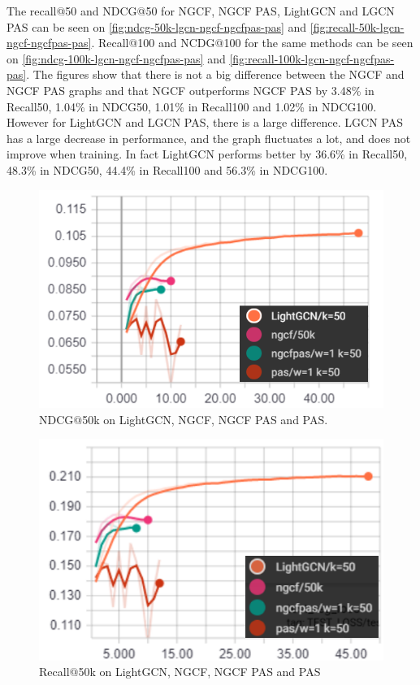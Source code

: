 The recall@50 and NDCG@50 for NGCF, NGCF PAS, LightGCN and LGCN PAS can be seen on \autoref{fig:ndcg-50k-lgcn-ngcf-ngcfpas-pas} and \autoref{fig:recall-50k-lgcn-ngcf-ngcfpas-pas}.
Recall@100 and NCDG@100 for the same methods can be seen on \autoref{fig:ndcg-100k-lgcn-ngcf-ngcfpas-pas} and \autoref{fig:recall-100k-lgcn-ngcf-ngcfpas-pas}.
The figures show that there is not a big difference between the NGCF and NGCF PAS graphs and that NGCF outperforms NGCF PAS by 3.48\% in Recall\@50, 1.04\% in NDCG\@50, 1.01\% in Recall\@100 and 1.02\% in NDCG\@100.
However for LightGCN and LGCN PAS, there is a large difference.
LGCN PAS has a large decrease in performance, and the graph fluctuates a lot, and does not improve when training.
In fact LightGCN performs better by 36.6\% in Recall\@50, 48.3\% in NDCG\@50, 44.4\% in Recall\@100 and 56.3\% in NDCG\@100.
\begin{figure}
    \includegraphics[width=\linewidth]{figures/graphs/ndcg-50k-lgcn-ngcf-ngcfpas-pas.png}
    \caption{NDCG$@$50k on LightGCN, NGCF, NGCF PAS and PAS.}
    \label{fig:ndcg-50k-lgcn-ngcf-ngcfpas-pas}
\end{figure}

\begin{figure}
    \includegraphics[width=\linewidth]{figures/graphs/recall-50k-lgcn-ngcf-ngcfpas-pas.png}
    \caption{Recall$@$50k on LightGCN, NGCF, NGCF PAS and PAS}
    \label{fig:recall-50k-lgcn-ngcf-ngcfpas-pas}
\end{figure}


